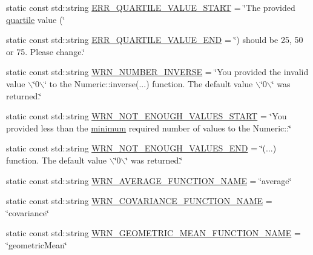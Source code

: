 \begin{DoxyCompactItemize}
\item 
static const std\-::string \hyperlink{classmultiscale_1_1Numeric_ac76a6a6f1fa8abae2855f4fed0f0d97e}{\-E\-R\-R\-\_\-\-Q\-U\-A\-R\-T\-I\-L\-E\-\_\-\-V\-A\-L\-U\-E\-\_\-\-S\-T\-A\-R\-T} = \char`\"{}\-The provided \hyperlink{classmultiscale_1_1Numeric_a127a2b3e5e659b4e493767ba23fc45da}{quartile} value (\char`\"{}
\item 
static const std\-::string \hyperlink{classmultiscale_1_1Numeric_ac63a2d1c105ab47208d6c40827f9769c}{\-E\-R\-R\-\_\-\-Q\-U\-A\-R\-T\-I\-L\-E\-\_\-\-V\-A\-L\-U\-E\-\_\-\-E\-N\-D} = \char`\"{}) should be 25, 50 or 75. \-Please change.\char`\"{}
\item 
static const std\-::string \hyperlink{classmultiscale_1_1Numeric_ac1e4755ec54d2c04217d0d1f4b5d346b}{\-W\-R\-N\-\_\-\-N\-U\-M\-B\-E\-R\-\_\-\-I\-N\-V\-E\-R\-S\-E} = \char`\"{}\-You provided the invalid value $\backslash$\char`\"{}0$\backslash$\char`\"{} to the \-Numeric\-::inverse(...) function. \-The default value $\backslash$\char`\"{}0$\backslash$\char`\"{} was returned.\char`\"{}
\item 
static const std\-::string \hyperlink{classmultiscale_1_1Numeric_ab78e644d069f448030e24fecb7c4c8d9}{\-W\-R\-N\-\_\-\-N\-O\-T\-\_\-\-E\-N\-O\-U\-G\-H\-\_\-\-V\-A\-L\-U\-E\-S\-\_\-\-S\-T\-A\-R\-T} = \char`\"{}\-You provided less than the \hyperlink{classmultiscale_1_1Numeric_a1ba7305dcaa1d1baf17946beb233145d}{minimum} required number of values to the \-Numeric\-::\char`\"{}
\item 
static const std\-::string \hyperlink{classmultiscale_1_1Numeric_a735efee33b8687c010a03cb1e5e9589c}{\-W\-R\-N\-\_\-\-N\-O\-T\-\_\-\-E\-N\-O\-U\-G\-H\-\_\-\-V\-A\-L\-U\-E\-S\-\_\-\-E\-N\-D} = \char`\"{}(...) function. \-The default value $\backslash$\char`\"{}0$\backslash$\char`\"{} was returned.\char`\"{}
\item 
static const std\-::string \hyperlink{classmultiscale_1_1Numeric_a65b22b0d9cb95ff5dde4b7b41f342774}{\-W\-R\-N\-\_\-\-A\-V\-E\-R\-A\-G\-E\-\_\-\-F\-U\-N\-C\-T\-I\-O\-N\-\_\-\-N\-A\-M\-E} = \char`\"{}average\char`\"{}
\item 
static const std\-::string \hyperlink{classmultiscale_1_1Numeric_a940b0ee737842f9113eb66b7c2cfa4a2}{\-W\-R\-N\-\_\-\-C\-O\-V\-A\-R\-I\-A\-N\-C\-E\-\_\-\-F\-U\-N\-C\-T\-I\-O\-N\-\_\-\-N\-A\-M\-E} = \char`\"{}covariance\char`\"{}
\item 
static const std\-::string \hyperlink{classmultiscale_1_1Numeric_a96ed0e32f79d8801370a922c8778f436}{\-W\-R\-N\-\_\-\-G\-E\-O\-M\-E\-T\-R\-I\-C\-\_\-\-M\-E\-A\-N\-\_\-\-F\-U\-N\-C\-T\-I\-O\-N\-\_\-\-N\-A\-M\-E} = \char`\"{}geometric\-Mean\char`\"{}

\end{DoxyCompactItemize}
